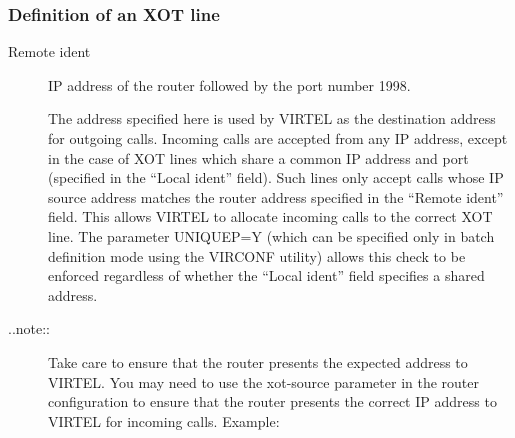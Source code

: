 \documentclass[letterpaper,10pt,english]{sphinxmanual}
\begin{document}


\subsubsection{Definition of an XOT line}
\label{\detokenize{connectivity_guide:definition-of-an-xot-line}}\begin{description}
\item[{Remote ident}] \leavevmode
IP address of the router followed by the port number 1998.

The address specified here is used by VIRTEL as the destination address for outgoing calls. Incoming calls are accepted from any IP address, except in the case of XOT lines which share a common IP address and port (specified in the “Local ident” field). Such lines only accept calls whose IP source address matches the router address specified in the “Remote ident” field. This allows VIRTEL to allocate incoming calls to the correct XOT line. The parameter UNIQUEP=Y (which can be specified only in batch definition mode
using the VIRCONF utility) allows this check to be enforced regardless of whether the “Local ident” field specifies a shared
address.

\item[{..note::}] \leavevmode
Take care to ensure that the router presents the expected address to VIRTEL. You may need to use the xot-source parameter in the router configuration to ensure that the router presents the correct IP address to VIRTEL for incoming calls. Example:

\end{description}
\end{document}
